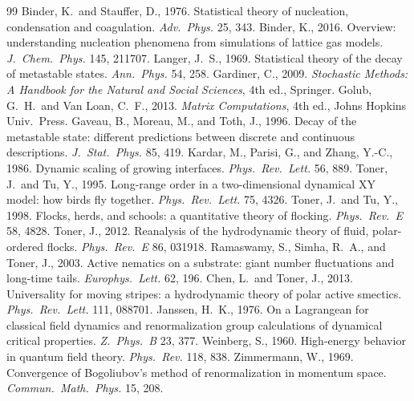 \documentclass[11pt,a4paper]{article}
\theoremstyle{plain}
\begin{document}
\begin{thebibliography}{99}
 Binder, K.\ and Stauffer, D., 1976. Statistical theory of nucleation, condensation and coagulation. \textit{Adv.\ Phys.} 25, 343.
 Binder, K., 2016. Overview: understanding nucleation phenomena from simulations of lattice gas models. \textit{J.\ Chem.\ Phys.} 145, 211707.
 Langer, J.~S., 1969. Statistical theory of the decay of metastable states. \textit{Ann.\ Phys.} 54, 258.
 Gardiner, C., 2009. \textit{Stochastic Methods: A Handbook for the Natural and Social Sciences}, 4th ed., Springer.
 Golub, G.~H.\ and Van Loan, C.~F., 2013. \textit{Matrix Computations}, 4th ed., Johns Hopkins Univ.\ Press.
 Gaveau, B., Moreau, M., and Toth, J., 1996. Decay of the metastable state: different predictions between discrete and continuous descriptions. \textit{J.\ Stat.\ Phys.} 85, 419.
 Kardar, M., Parisi, G., and Zhang, Y.-C., 1986. Dynamic scaling of growing interfaces. \textit{Phys.\ Rev.\ Lett.} 56, 889.
 Toner, J.\ and Tu, Y., 1995. Long-range order in a two-dimensional dynamical XY model: how birds fly together. \textit{Phys.\ Rev.\ Lett.} 75, 4326.
 Toner, J.\ and Tu, Y., 1998. Flocks, herds, and schools: a quantitative theory of flocking. \textit{Phys.\ Rev.\ E} 58, 4828.
 Toner, J., 2012. Reanalysis of the hydrodynamic theory of fluid, polar-ordered flocks. \textit{Phys.\ Rev.\ E} 86, 031918.
 Ramaswamy, S., Simha, R.~A., and Toner, J., 2003. Active nematics on a substrate: giant number fluctuations and long-time tails. \textit{Europhys.\ Lett.} 62, 196.
 Chen, L.\ and Toner, J., 2013. Universality for moving stripes: a hydrodynamic theory of polar active smectics. \textit{Phys.\ Rev.\ Lett.} 111, 088701.
 Janssen, H.~K., 1976. On a Lagrangean for classical field dynamics and renormalization group calculations of dynamical critical properties. \textit{Z.\ Phys.\ B} 23, 377.
 Weinberg, S., 1960. High-energy behavior in quantum field theory. \textit{Phys.\ Rev.} 118, 838.
 Zimmermann, W., 1969. Convergence of Bogoliubov's method of renormalization in momentum space. \textit{Commun.\ Math.\ Phys.} 15, 208.

\end{thebibliography}
\end{document}
